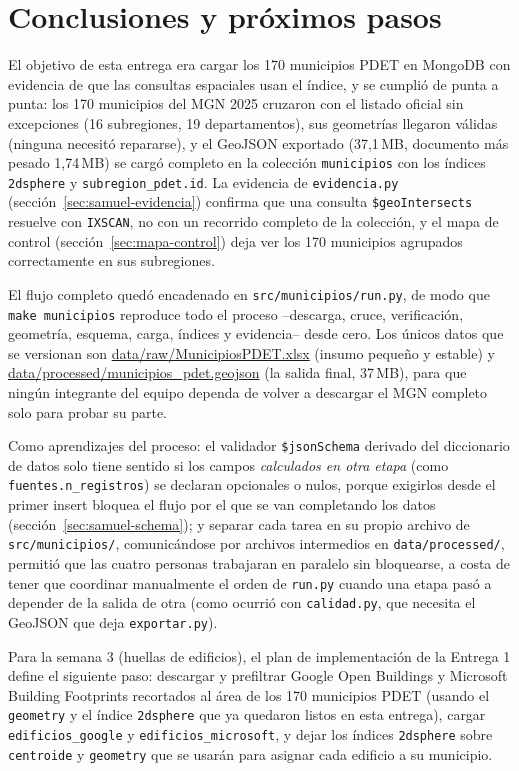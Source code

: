 \documentclass[11pt,a4paper]{article}
\newcommand{\campo}[1]{\texttt{#1}}
\newcommand{\ruta}[1]{\begingroup\urlstyle{tt}\url{#1}\endgroup}
\begin{document}
\section{Conclusiones y próximos pasos}
\label{sec:conclusiones}

El objetivo de esta entrega era cargar los 170 municipios PDET en MongoDB
con evidencia de que las consultas espaciales usan el índice, y se cumplió
de punta a punta: los 170 municipios del MGN 2025 cruzaron con el listado
oficial sin excepciones (16 subregiones, 19 departamentos), sus geometrías
llegaron válidas (ninguna necesitó repararse), y el GeoJSON exportado
(37,1\,MB, documento más pesado 1,74\,MB) se cargó completo en la colección
\campo{municipios} con los índices \campo{2dsphere} y
\campo{subregion\_pdet.id}. La evidencia de
\campo{evidencia.py} (sección~\ref{sec:samuel-evidencia}) confirma que una
consulta \campo{\$geoIntersects} resuelve con \campo{IXSCAN}, no con un
recorrido completo de la colección, y el mapa de control
(sección~\ref{sec:mapa-control}) deja ver los 170 municipios agrupados
correctamente en sus subregiones.

El flujo completo quedó encadenado en \campo{src/municipios/run.py}, de
modo que \campo{make \newline municipios} reproduce todo el proceso --descarga,
cruce, verificación, geometría, esquema, carga, índices y evidencia-- desde
cero. Los únicos datos que se versionan son
\ruta{data/raw/MunicipiosPDET.xlsx} (insumo pequeño y estable) y
\ruta{data/processed/municipios_pdet.geojson} (la salida final, 37\,MB),
para que ningún integrante del equipo dependa de volver a descargar el MGN
completo solo para probar su parte.

Como aprendizajes del proceso: el validador \campo{\$jsonSchema} derivado
del diccionario de datos solo tiene sentido si los campos \emph{calculados en otra etapa}
(como \campo{fuentes.n\_registros}) se declaran opcionales o nulos, porque
exigirlos desde el primer insert bloquea el flujo por el que se van
completando los datos (sección~\ref{sec:samuel-schema}); y separar cada
tarea en su propio archivo de \campo{src/municipios/}, comunicándose por
archivos intermedios en \campo{data/processed/}, permitió que las cuatro
personas trabajaran en paralelo sin bloquearse, a costa de tener que
coordinar manualmente el orden de \campo{run.py} cuando una etapa pasó a
depender de la salida de otra (como ocurrió con \campo{calidad.py}, que
necesita el GeoJSON que deja \campo{exportar.py}).

Para la semana 3 (huellas de edificios), el plan de implementación de la
Entrega 1 define el siguiente paso: descargar y prefiltrar Google Open
Buildings y Microsoft Building Footprints recortados al área de los 170
municipios PDET (usando el \campo{geometry} y el índice \campo{2dsphere}
que ya quedaron listos en esta entrega), cargar \campo{edificios\_google} y
\campo{edificios\_microsoft}, y dejar los índices \campo{2dsphere} sobre
\campo{centroide} y \campo{geometry} que se usarán para asignar cada
edificio a su municipio.
\end{document}
